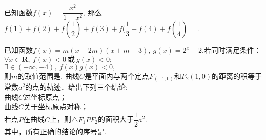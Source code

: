 \documentclass[marginline,noindent,answers,adobefonts]{BHCexam}
\begin{document}
\begin{questions}
\qs 已知函数$f(x)=\dfrac{x^2}{1+x^2},~$那么$ f(1)+f(2)+f(\dfrac{1}{2})+f(3)+f(\dfrac{1}{3}+f(4)+f(\dfrac{1}{4})= $\tk.

\qs 已知函数$f(x)=m(x-2m)(x+m+3),~g(x)=2^x-2.$若同时满足条件：\\
 $ \forall x \in \mathbf{R} ,~f(x)<0~\text{或}~g(x)<0;$\\
 $ \exists \in (-\infty,-4),~f(x)g(x)<0, $\\
则$ m $的取值范围是\tk.
\qs 曲线$C$是平面内与两个定点$ F_(-1,0) $和$F_2(1,0)$的距离的积等于常数$ a^2 $的点的轨迹．给出下列三个结论:\\
 曲线$ C $过坐标原点；\\
 曲线$ C $关于坐标原点对称；\\
 若点$ P $在曲线$ C $上，则$ \triangle F_1PF_2 $的面积大于$ \dfrac{1}{2}a^2. $\\
其中，所有正确的结论的序号是\tk.


\end{questions}
\end{document}
